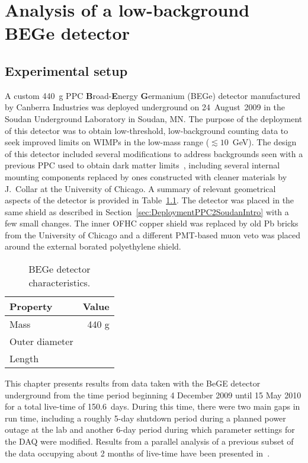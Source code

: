 \chapter{Analysis of a low-background BEGe detector}
\label{chap:AnalysisBeGe}
	\section{Experimental setup}
	\label{sec:BeGeExperimentalSetup}

A custom 440~g PPC \textbf{B}road-\textbf{E}nergy \textbf{G}ermanium (BEGe) detector manufactured by Canberra Industries was deployed underground on 24~August~2009 in the Soudan Underground Laboratory in Soudan, MN.  The purpose of the deployment of this detector was to obtain low-threshold, low-background counting data to seek improved limits on WIMPs in the low-mass range ($\lesssim10$~GeV).  The design of this detector included several modifications to address backgrounds seen with a previous PPC used to obtain dark matter limits~\cite{Aalseth:2008aa}, including several internal mounting components replaced by ones constructed with cleaner materials by J.~Collar at the University of Chicago.  A summary of relevant geometrical aspects of the detector is provided in Table~\ref{tab:BEGeCharacteristics}.
The detector was placed in the same shield as described in Section~\ref{sec:DeploymentPPC2SoudanIntro} with a few small changes.  The inner OFHC copper shield was replaced by old Pb bricks from the University of Chicago and a different PMT-based muon veto was placed around the external borated polyethylene shield.   %

			\begin{table}
				\centering
				\begin{tabular}{l r}
					\toprule
					Property & Value \\
					\midrule
					Mass & 440 g \\
					Outer diameter &  \\
					Length &  \\
					\bottomrule
				\end{tabular}
				\caption[BEGe detector characteristics]
				{BEGe detector characteristics.  }
				\label{tab:BEGeCharacteristics}
			\end{table}

This chapter presents results from data taken with the BeGE detector underground from the time period beginning 4 December 2009 until 15 May 2010 for a total live-time of 150.6~days.  During this time, there were two main gaps in run time, including a roughly 5-day shutdown period during a planned power outage at the lab and another 6-day period during which parameter settings for the DAQ were modified.  Results from a parallel analysis of a previous subset of the data occupying about 2 months of live-time have been presented in~\cite{Aalseth:2010aa}.

